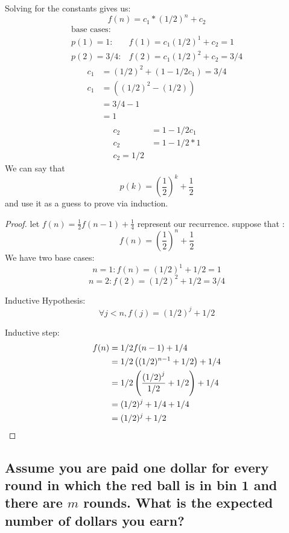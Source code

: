 \documentclass[titlepage]{article}
\theoremstyle{definition}
\begin{document}
    Solving for the constants gives us:
    \[ f(n) = c_1 * (1/2)^n + c_2 \]
    \begin{align*}
      \text{base cases}: \\
      p(1) = 1: & f(1) = c_1 (1/2)^1 + c_2 = 1  \\
      p(2) = 3/4: & f(2) = c_1 (1/2)^2 + c_2 = 3/4
    \end{align*}
    \begin{align*}
      c_1 &= (1/2)^2 + (1 - 1/2 c_1) = 3/4 \\
      c_1 &= \left( (1/2)^2 - (1/2)\right) \\
          &= 3/4 - 1 \\
          &= 1 \\
    \end{align*}
    \begin{align*}
      c_2 &= 1 - 1/2 c_1 \\
      c_2 &= 1 - 1/2 * 1 \\
      c_2 = 1/2
    \end{align*}
  We can say that 
  \[ p(k) = \left(\frac{1}{2}\right)^k + \frac{1}{2} \]
  and use it as a guess to prove via induction.
  \begin{proof}
    let $f(n) = \frac{1}{2} f(n-1) + \frac{1}{4}$ represent our recurrence. 
    suppose that :
    \[ f(n) = \left(\frac{1}{2}\right)^n + \frac{1}{2} \]
    We have two base cases:
    \[ n =1: f(n) = (1/2)^1 + 1/2 = 1 \]
    \[ n = 2: f(2) = (1/2)^2 + 1/2 = 3/4 \]

    Inductive Hypothesis:
    \[ \forall j < n, f(j) = (1/2)^j + 1/2 \]

    Inductive step:
    \begin{align*}
      f(n) &= 1/2 f(n-1) + 1/4 \\
      &= 1/2\left( (1/2)^{n-1} + 1/2 \right) + 1/4 \\
      &= 1/2 \left( \frac{\left(1/2\right)^j}{1/2} + 1/2 \right) + 1/4 \\
      &= (1/2)^j + 1/4 + 1/4 \\
      &= (1/2)^j + 1/2 \qedhere
    \end{align*}
  \end{proof}


  \subsection{Assume you are paid one dollar for every round in which the red
    ball is in bin 1 and there are $m$ rounds. What is the expected number of
    dollars you earn?}
\end{document}
